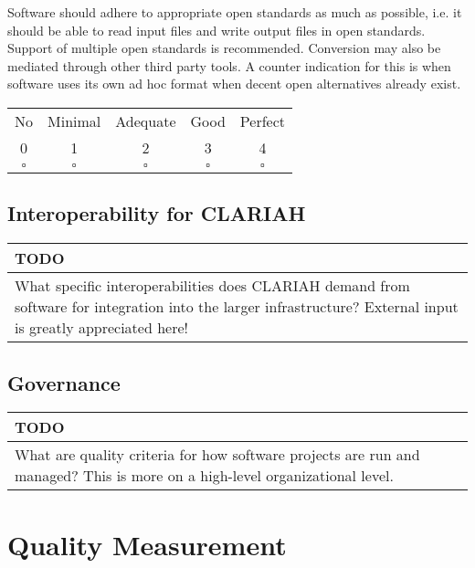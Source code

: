\documentclass[a4paper,11pt]{article}
\newenvironment{TODO}{
\begin{center}
    \begin{tabular}[h!]{|p{0.8\textwidth}|}
    \hline
    {\bf TODO}\\\hline}
{   \\\hline
    \end{tabular}
\end{center}}
\newcommand\CheckTable{%
  \begin{tabular}{ccccc}
    No & Minimal & Adequate & Good & Perfect \\
    0 & 1 & 2 & 3 & 4 \\
    \hline
    $\square$ & $\square$ & $\square$ & $\square$ & $\square$ \\
  \end{tabular}%
}
\begin{document}
Software should adhere to appropriate open standards as much as possible, i.e.
it should be able to read input files and write output files in open
standards. Support of multiple open standards is recommended. Conversion may
also be mediated through other third party tools. A counter indication for this
is when software uses its own ad hoc format when decent open alternatives
already exist.

\CheckTable

\subsection{Interoperability for CLARIAH}\label{sec:intCLA}


\begin{TODO} 
What specific interoperabilities does CLARIAH demand from software for
integration into the larger infrastructure?  External input is greatly
appreciated here!
\end{TODO}


\subsection{Governance}\label{sec:gov}




\begin{TODO} 
What are quality criteria for how software projects are run and
managed? This is more on a high-level organizational level.
\end{TODO}


\section{Quality Measurement}
\end{document}
